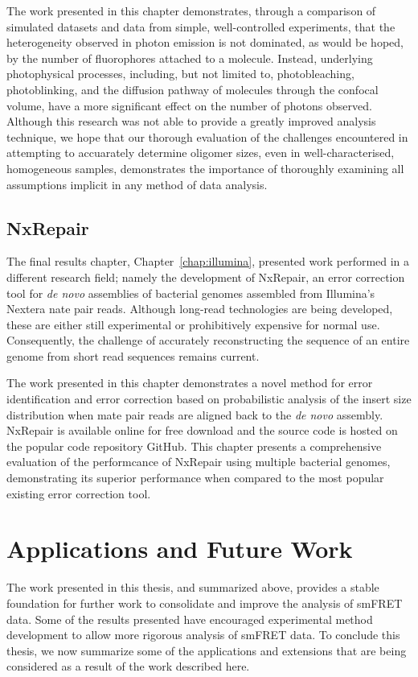 The work presented in this chapter demonstrates, through a comparison of simulated datasets and data from simple, well-controlled experiments, that the heterogeneity observed in photon emission is not dominated, as would be hoped, by the number of fluorophores attached to a molecule. Instead, underlying photophysical processes, including, but not limited to, photobleaching, photoblinking, and the diffusion pathway of molecules through the confocal volume, have a more significant effect on the number of photons observed. Although this research was not able to provide a greatly improved analysis technique, we hope that our thorough evaluation of the challenges encountered in attempting to accuarately determine oligomer sizes, even in well-characterised, homogeneous samples, demonstrates the importance of thoroughly examining all assumptions implicit in any method of data analysis.   

\subsection{NxRepair}
The final results chapter, Chapter~\ref{chap:illumina}, presented work performed in a different research field; namely the development of NxRepair, an error correction tool for \emph{de novo} assemblies of bacterial genomes assembled from Illumina's Nextera nate pair reads. Although long-read technologies are being developed, these are either still experimental or prohibitively expensive for normal use. Consequently, the challenge of accurately reconstructing the sequence of an entire genome from short read sequences remains current. 

The work presented in this chapter demonstrates a novel method for error identification and error correction based on probabilistic analysis of the insert size distribution when mate pair reads are aligned back to the \emph{de novo} assembly. NxRepair is available online for free download and the source code is hosted on the popular code repository GitHub.  This chapter presents a comprehensive evaluation of the performcance of NxRepair using multiple bacterial genomes, demonstrating its superior performance when compared to the most popular existing error correction tool.

\section{Applications and Future Work}
The work presented in this thesis, and summarized above, provides a stable foundation for further work to consolidate and improve the analysis of smFRET data. Some of the results presented have encouraged experimental method development to allow more rigorous analysis of smFRET data. To conclude this thesis, we now summarize some of the applications and extensions that are being considered as a result of the work described here. 

